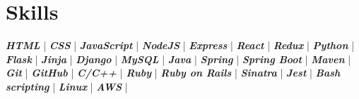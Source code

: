 \section{Skills} 
\textbf{\emph{HTML}} | 
\textbf{\emph{CSS}} | 
\textbf{\emph{JavaScript}} | 
\textbf{\emph{NodeJS}} | 
\textbf{\emph{Express}} | 
\textbf{\emph{React}} | 
\textbf{\emph{Redux}} | 
\textbf{\emph{Python}} | 
\textbf{\emph{Flask}} | 
\textbf{\emph{Jinja}} | 
\textbf{\emph{Django}} | 
\textbf{\emph{MySQL}} | 
\textbf{\emph{Java}} | 
\textbf{\emph{Spring}} | 
\textbf{\emph{Spring Boot}} | 
\textbf{\emph{Maven}} | 
\textbf{\emph{Git}} | 
\textbf{\emph{GitHub}} | 
\textbf{\emph{C/C++}} | 
\textbf{\emph{Ruby}} | 
\textbf{\emph{Ruby on Rails}} | 
\textbf{\emph{Sinatra}} | 
\textbf{\emph{Jest}} | 
\textbf{\emph{Bash scripting}} | 
\textbf{\emph{Linux}} | 
\textbf{\emph{AWS}} | 


